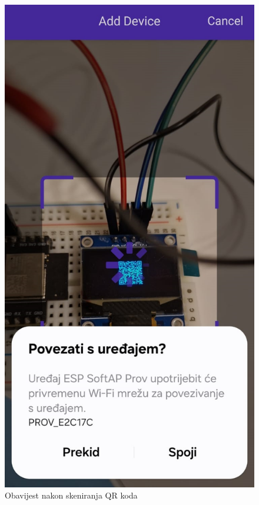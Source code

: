 \begin{figure}[ht]
	\begin{minipage}[t]{0.3\textwidth}
		\includegraphics[width=\linewidth]{imgs/esp_softap_app1}
		\caption{Obavijest nakon skeniranja QR koda}
		\label{fig:esp_softap_app1}
	\end{minipage}

\end{figure}
